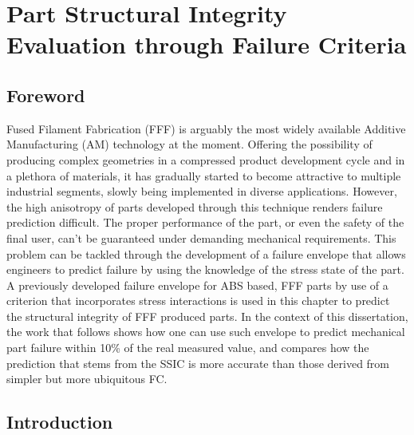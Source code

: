 \documentclass[main.tex]{subfiles}
\begin{document}
\chapter{Part Structural Integrity Evaluation through Failure Criteria} \label{ch:fc_val}
\section{Foreword}
Fused Filament Fabrication (FFF) is arguably the most widely available Additive Manufacturing (AM) technology at the moment. Offering the possibility of producing complex geometries in a compressed product development cycle and in a plethora of materials, it has gradually started to become attractive to multiple industrial segments, slowly being implemented in diverse applications. However, the high anisotropy of parts developed through this technique renders failure prediction difficult. The proper performance of the part, or even the safety of the final user, can't be guaranteed under demanding mechanical requirements. This problem can be tackled through the development of a failure envelope that allows engineers to predict failure by using the knowledge of the stress state of the part. A previously developed failure envelope for ABS based, FFF parts by use of a criterion that incorporates stress interactions is used in this chapter to predict the structural integrity of FFF produced parts. In the context of this dissertation, the work that follows shows how one can use such envelope to predict mechanical part failure within 10\% of the real measured value, and compares how the prediction that stems from the SSIC is more accurate than those derived from simpler but more ubiquitous FC.

\section{Introduction}\label{sec:SSIC_intr}
\end{document}
